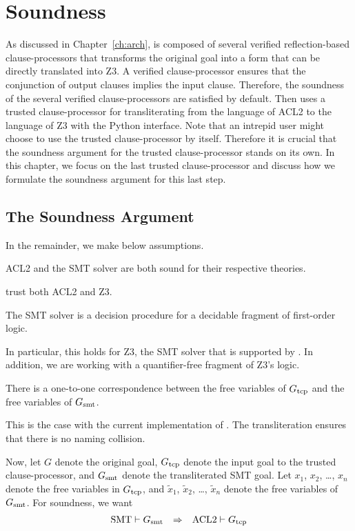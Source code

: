 \chapter{Soundness}
\label{ch:soundness}

As discussed in Chapter~\ref{ch:arch}, \smtlink{} is composed of several
verified reflection-based clause-processors that transforms the original goal
into a form that can be directly translated into Z3.
A verified clause-processor ensures that the conjunction of output clauses
implies the input clause.
Therefore, the soundness of the several verified clause-processors are satisfied
by default.
Then \smtlink{} uses a trusted clause-processor for transliterating from the
language of ACL2 to the language of Z3 with the Python interface.
Note that an intrepid user might choose to use the trusted clause-processor by
itself. Therefore it is crucial that the soundness argument for the trusted
clause-processor stands on its own.
In this chapter, we focus on the last trusted clause-processor and discuss how
we formulate the soundness argument for this last step.

\section{The Soundness Argument}\label{sec:soundarg}
In the remainder, we make below assumptions.
\begin{assumption}
  ACL2 and the \acs{SMT} solver are both sound for their respective
  theories.
\end{assumption}
\smtlink{} trust both ACL2 and Z3.

\begin{assumption}
  The \acs{SMT} solver is a decision procedure for a decidable fragment of
  first-order logic.
\end{assumption}
In particular, this holds for Z3, the \acs{SMT} solver that is supported
by \smtlink{}.
In addition, we are working with a quantifier-free fragment of Z3's
logic.

\begin{assumption}
  There is a one-to-one correspondence between the free variables of $G_{\mathrm{tcp}}$
  and the free variables of $G_{\mathrm{smt}}$.
\end{assumption}
This is the case with the current implementation of \smtlink{}. The
transliteration ensures that there is no naming collision.

Now, let $G$ denote the original goal, $G_{\mathrm{tcp}}$ denote the input goal to the
trusted clause-processor, and $G_{\mathrm{smt}}$ denote the transliterated \acs{SMT} goal.
Let $x_1$, $x_2$, \ldots, $x_n$ denote the free variables in $G_{\mathrm{tcp}}$, and
$\tilde{x}_1$, $\tilde{x}_2$, \ldots, $\tilde{x}_n$ denote the free variables of
$G_{\mathrm{smt}}$. For soundness, we want
\begin{equation}\label{eq:soundness}\begin{array}{rcl}
\mathrm{SMT} \vdash G_{\mathrm{smt}} &\Rightarrow& \mathrm{ACL2} \vdash G_{\mathrm{tcp}}
\end{array}\end{equation}

